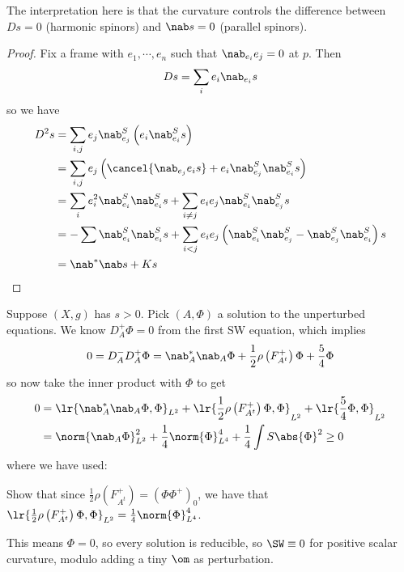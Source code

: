 \documentclass{amsart}
\begin{document}
\begin{rmk}
The interpretation here is that the curvature controls the difference between $Ds = 0$ (harmonic spinors)
and $\nab s = 0$ (parallel spinors).
\end{rmk}

\begin{proof}
Fix a frame with $e_1 , \cdots , e_n$ such that $\nab_{e_i} e_j = 0$ at $p$.
Then
\begin{equation}
Ds = \sum_i e_i \nab_{e_i} s
\end{equation}
so we have
\begin{align}
D^2 s &= \sum_{i,j} e_j \nab_{e_j}^S \left( 
e_i\nab_{e_i}^S s\right) \\
&= \sum_{i,j} e_j  
\left( 
\cancel{\nab_{e_j} e_i s}
+ e_i \nab_{e_j}^S \nab_{e_i}^Ss
\right)
\\
&= \sum_i e_i^2 \nab_{e_i}^S \nab_{e_i}^Ss + 
\sum_{i\neq j} e_i e_j \nab_{e_i}^S \nab_{e_j}^Ss\\
&= -\sum \nab_{e_i}^S \nab_{e_i}^S s
+ \sum_{i < j} e_i e_j \left( \nab_{e_i}^S \nab_{e_j}^S -\nab_{e_j}^S \nab_{e_i}^S \right)s\\
&=\nab^* \nab s + K s
\end{align}
\end{proof}

Suppose $\left( X , g \right)$ has $s > 0$. 
Pick $\left( A , \Phi \right)$ a solution to the unperturbed equations. 
We know $D_A^+ \Phi = 0$ from the first SW equation, which implies 
\begin{equation}
0 = D_A^- D_A^+ \Phi = 
\nab_A^* \nab_A \Phi + 
\frac{1}{2} \rho\left( F_{A^t}^+ \right) \Phi + \frac{5}{4} \Phi
\end{equation}
so now take the inner product with $\Phi$ to get
\begin{align}
0 &= \lr{\nab_A^* \nab_A \Phi  , \Phi}_{L^2} + 
\lr{\frac{1}{2} \rho\left( F_{A^t}^+ \right) \Phi, \Phi}_{L^2} + 
\lr{\frac{5}{4} \Phi, \Phi}_{L^2}\\
&= \norm{\nab_A \Phi}_{L^2}^2 + 
\frac{1}{4}\norm{\Phi}_{L^4}^4 + 
\frac{1}{4} \int S\abs{\Phi}^2 \geq 0
\end{align}
where we have used:
\begin{exr}
Show that since $\frac{1}{2} \rho\left( F_{A^t}^+ \right) = \left( \Phi \Phi^+ \right)_0$, we 
have that
$\lr{\frac{1}{2} \rho\left( F_{A^t}^+ \right) \Phi, \Phi}_{L^2} = \frac{1}{4}\norm{\Phi}_{L^4}^4$.
\end{exr}

This means $\Phi = 0$, so every solution is reducible, so $\SW \equiv 0$ 
for positive scalar curvature, modulo adding a tiny $\om$ as perturbation.
\end{document}
